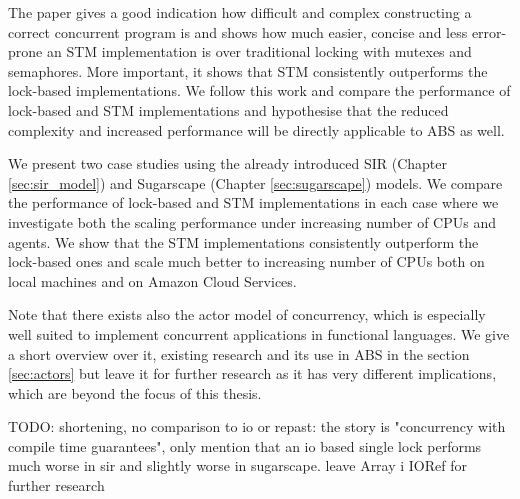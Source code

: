 \medskip

The paper \cite{discolo_lock_2006} gives a good indication how difficult and complex constructing a correct concurrent program is and shows how much easier, concise and less error-prone an STM implementation is over traditional locking with mutexes and semaphores. More important, it shows that STM consistently outperforms the lock-based implementations. We follow this work and compare the performance of lock-based and STM implementations and hypothesise that the reduced complexity and increased performance will be directly applicable to ABS as well.

We present two case studies using the already introduced SIR (Chapter \ref{sec:sir_model}) and Sugarscape (Chapter \ref{sec:sugarscape}) models. We compare the performance of lock-based and STM implementations in each case where we investigate both the scaling performance under increasing number of CPUs and agents. We show that the STM implementations consistently outperform the lock-based ones and scale much better to increasing number of CPUs both on local machines and on Amazon Cloud Services.

Note that there exists also the actor model of concurrency, which is especially well suited to implement concurrent applications in functional languages. We give a short overview over it, existing research and its use in ABS in the section \ref{sec:actors} but leave it for further research as it has very different implications, which are beyond the focus of this thesis.

TODO: shortening, no comparison to io or repast: the story is "concurrency with compile time guarantees", only mention that an io based single lock performs much worse in sir and slightly worse in sugarscape. leave Array i IORef for further research











